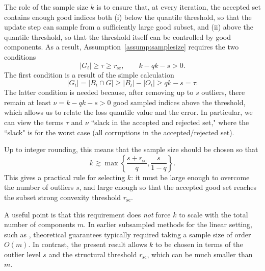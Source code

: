 \documentclass[11pt]{article}
\begin{document}
The role of the sample size $k$ is to ensure that, at every iteration, the accepted set contains enough good indices both
(i) below the quantile threshold, so that the update step can {sample from} a sufficiently large good subset, and
(ii) above the quantile threshold, so that the threshold itself can be controlled by good components. As a result, Assumption~\ref{assump:samplesize} requires the two conditions
\[
|G_t| \ge  \tau \ge r_{\mathrm{sc}},
\qquad
{k- qk-s > 0}.
\]
{The first condition is a result of the simple calculation \begin{equation}\label{eq:ind-lower-bd}
|G_t|
=
|B_t\cap G|
\ge
|B_t|-|O_t|
\ge
 qk-s
=
\tau.
\end{equation}} The latter condition is needed because, after removing up to $s$ outliers, there remain at least {$\nu= k- qk-s >0$} good sampled indices above the threshold, {which allows us to relate the loss quantile value and the error}. In particular, we can view the terms $\tau$ and $\nu$
   ``slack in the accepted and rejected set," where the ``slack" is for the worst case (all corruptions in the accepted/rejected set).

Up to integer rounding, this means that the sample size should be chosen so that
\[
k
\gtrsim
\max\left\{
\frac{s+r_{\mathrm{sc}}}{q},
\frac{s}{1-q}
\right\}.
\]
This gives a practical rule for selecting $k$: it must be large enough to overcome the number of outliers $s$, and large enough so that the accepted good set reaches the subset strong convexity threshold $r_{\mathrm{sc}}$.


    A useful point is that this requirement does \emph{not} force $k$ to scale with the total number of components $m$. In earlier subsampled methods for the linear setting, such as \cite{haddock2023subsampled, HNRS20}, theoretical guarantees typically required taking a sample size of order $O(m)$. In contrast, the present result allows $k$ to be chosen in terms of the outlier level $s$ and the structural threshold $r_{\mathrm{sc}}$, which can be much smaller than $m$.
\end{document}
